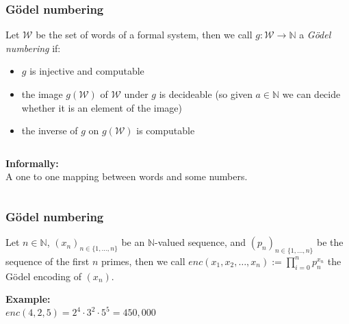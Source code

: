 \begin{frame}
    \frametitle{Gödel numbering}
    \begin{definition}
        Let $\mathcal{W}$ be the set of words of a formal system, then we call $g: \mathcal{W} \rightarrow \mathbb{N}$ a \emph{Gödel numbering} if:
        \begin{itemize}
            \pause \item $g$ is injective and computable
            \pause \item the image $g(\mathcal{W})$ of $\mathcal{W}$ under $g$ is decideable (so given $a \in \mathbb{N}$ we can decide whether it is an element of the image)
            \pause \item the inverse of $g$ on $g(\mathcal{W})$ is computable
        \end{itemize}
    \end{definition}
    \begin{columns}
      \begin{column}{.4\textwidth}
        \onslide\textbf{Informally:}\\A one to one mapping between words and some numbers.
      \end{column}
      \begin{column}{.6\textwidth}
        \onslide\begin{figure}
        \end{figure}
      \end{column}
    \end{columns}
\end{frame}

\begin{frame}
  \frametitle{Gödel numbering}
  \begin{definition}
      Let $n \in \mathbb{N}$, $(x_n)_{n \in \{1,\hdots,n\}}$ be an $\mathbb{N}$-valued sequence, and $(p_n)_{n \in \{1,\hdots,n\}}$ be the sequence of the first $n$ primes, then we call $enc(x_1, x_2, \hdots, x_n) := \prod_{i=0}^{n} p_n^{x_n}$ the Gödel encoding of $(x_n)$. 
  \end{definition}

  \pause \textbf{Example:}\\$enc(4,2,5) = 2^4 \cdot 3^2 \cdot 5^5 = 450,000$
\end{frame}


